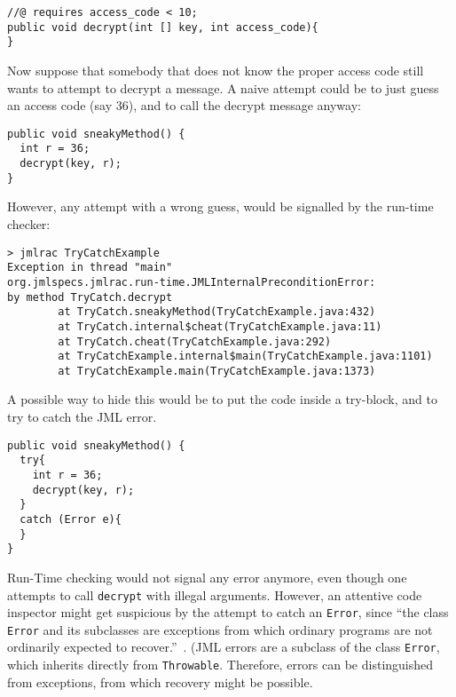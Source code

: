 \documentclass[]{llncs}
\begin{document}
\begin{verbatim}
//@ requires access_code < 10;
public void decrypt(int [] key, int access_code){
}
\end{verbatim}


Now suppose that somebody that does not know the proper access code
still wants to attempt to decrypt a message. A naive attempt could be
to just guess an access code (say 36), and to call the decrypt message anyway:

\begin{verbatim}
public void sneakyMethod() {
  int r = 36; 
  decrypt(key, r);                                           
}
\end{verbatim}

However, any attempt with a wrong guess, would be signalled by the
run-time checker:
\begin{verbatim}
> jmlrac TryCatchExample
Exception in thread "main" 
org.jmlspecs.jmlrac.run-time.JMLInternalPreconditionError: 
by method TryCatch.decrypt
        at TryCatch.sneakyMethod(TryCatchExample.java:432)
        at TryCatch.internal$cheat(TryCatchExample.java:11)
        at TryCatch.cheat(TryCatchExample.java:292)
        at TryCatchExample.internal$main(TryCatchExample.java:1101)
        at TryCatchExample.main(TryCatchExample.java:1373)
\end{verbatim}

A possible way to hide this would be to put the code inside a
try-block, and to try to catch the JML error.

\begin{verbatim}
public void sneakyMethod() {
  try{ 
    int r = 36; 
    decrypt(key, r);                                           
  }           
  catch (Error e){
  }
}
\end{verbatim}
Run-Time checking would not signal any error anymore, even though one
attempts to call \texttt{decrypt} with illegal arguments. However, an
attentive code inspector might get suspicious by the attempt to catch
an \texttt{Error}, since ``the class \texttt{Error} and its subclasses
are exceptions from which ordinary programs are not ordinarily
expected to recover.''~\cite[\S 11.5]{GoslingJSB05}. (JML errors are a
subclass of the class \texttt{Error}, which inherits directly from
\texttt{Throwable}. Therefore, errors can be distinguished from
exceptions, from which recovery might be possible.
\end{document}

